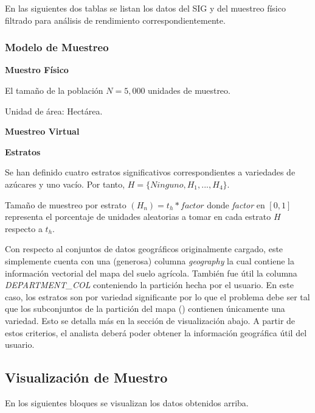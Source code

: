 \documentclass{article}
\begin{document}
En las siguientes dos tablas se listan los datos del SIG y del muestreo físico filtrado para análisis de rendimiento correspondientemente.

\subsubsection{Modelo de Muestreo}

\textbf{Muestro Físico}

\bigbreak

El tamaño de la población $N = 5,000$ unidades de muestreo.

\bigbreak

Unidad de área: Hectárea.

\bigbreak

\textbf{Muestreo Virtual}

\bigbreak

\textbf{Estratos}

\bigbreak

Se han definido cuatro estratos significativos correspondientes a variedades de azúcares y uno vacío. Por tanto, $H = \{ Ninguno, H_1, ... , H_4 \}$.

\bigbreak

Tamaño de muestreo por estrato $(H_n) = t_h * factor$ donde \textit{factor} en $[0,1]$ representa el porcentaje de unidades aleatorias a tomar en cada estrato $H$ respecto a $t_h$.

\bigbreak

Con respecto al conjuntos de datos geográficos originalmente cargado, este simplemente cuenta con una (generosa) columna \textit{geography} la cual contiene la información vectorial del mapa del suelo agrícola. También fue útil la columna \textit{DEPARTMENT\_COL} conteniendo la partición hecha por el usuario. En este caso, los estratos son por variedad significante por lo que el problema debe ser tal que los subconjuntos de la partición del mapa () contienen únicamente una variedad. Esto se detalla más en la sección de visualización abajo. A partir de estos criterios, el analista deberá poder obtener la información geográfica útil del usuario.

\subsection{Visualización de Muestro}

En los siguientes bloques se visualizan los datos obtenidos arriba.
\end{document}
